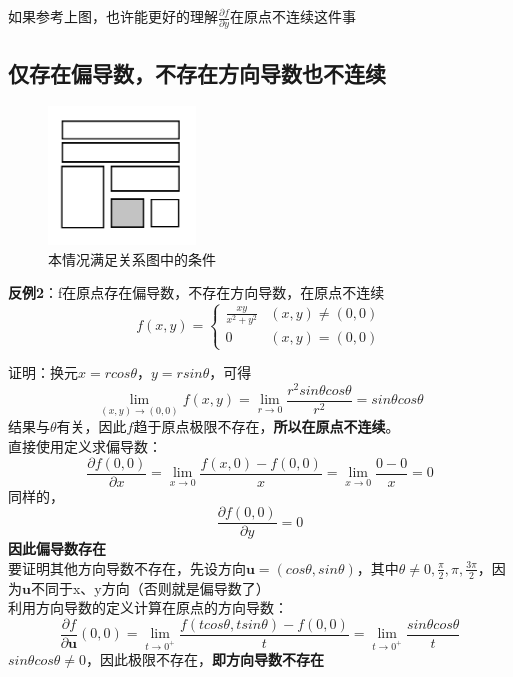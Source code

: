 \documentclass{article}
\begin{document}
如果参考上图，也许能更好的理解$\frac{\partial f}{\partial y}$在原点不连续这件事

\newpage

\subsection{仅存在偏导数，不存在方向导数也不连续}
\begin{figure}[!h]
    \centering
    \includegraphics[width=0.35\textwidth]{pic/03.png}
    \caption{本情况满足关系图中的条件}
\end{figure}

\textbf{反例2}：f在原点存在偏导数，不存在方向导数，在原点不连续
\[f(x,y)= \begin{cases} \frac{xy}{x^2+y^2}   & (x,y) \neq (0,0)\\0 & (x,y) = (0,0)\end{cases}\]

证明：换元$x=rcos\theta$，$y=rsin\theta$，可得
\[\lim\limits_{(x,y) \rightarrow (0,0)} f(x,y) =\lim\limits_{r \rightarrow 0} \frac{r^2sin\theta cos\theta}{r^2}=sin\theta cos\theta\]
结果与$\theta$有关，因此$f$趋于原点极限不存在，\textbf{所以在原点不连续}。\\
直接使用定义求偏导数：
\[\frac{\partial f(0,0)}{\partial x}=  \lim\limits_{x \rightarrow 0} \frac{f(x,0)-f(0,0)}{x} = \lim\limits_{x \rightarrow 0} \frac{0-0}{x}=0\]
同样的，
\[\frac{\partial f(0,0)}{\partial y} = 0\]
\textbf{因此偏导数存在}\\
要证明其他方向导数不存在，先设方向$\mathbf{u}=(cos\theta,sin\theta)$，其中$\theta \neq 0,\frac{\pi}{2},\pi,\frac{3\pi}{2}$，因为$\mathbf{u}$不同于x、y方向（否则就是偏导数了）\\
利用方向导数的定义计算在原点的方向导数：
\[\frac{\partial f}{\partial \mathbf{u}}(0,0) =\lim\limits_{t \rightarrow 0^+} \frac{f(tcos\theta,tsin\theta)-f(0,0)}{t}=\lim\limits_{t \rightarrow 0^+} \frac{sin\theta cos\theta}{t}\]
$sin\theta cos\theta \neq 0$，因此极限不存在，\textbf{即方向导数不存在}

\newpage
\end{document}
